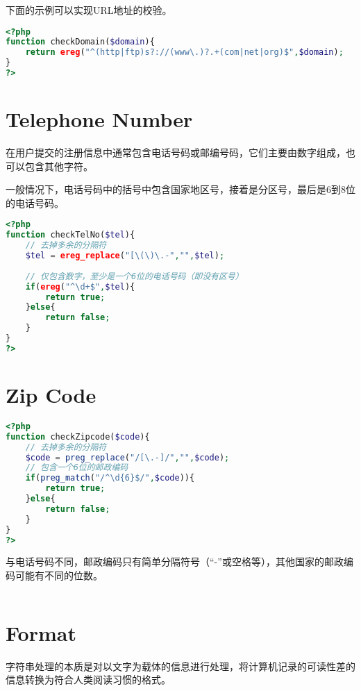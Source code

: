下面的示例可以实现URL地址的校验。


\begin{lstlisting}[language=PHP]
<?php
function checkDomain($domain){
	return ereg("^(http|ftp)s?://(www\.)?.+(com|net|org)$",$domain);
}
?>
\end{lstlisting}

\chapter{Telephone Number}


在用户提交的注册信息中通常包含电话号码或邮编号码，它们主要由数字组成，也可以包含其他字符。

一般情况下，电话号码中的括号中包含国家地区号，接着是分区号，最后是6到8位的电话号码。

\begin{lstlisting}[language=PHP]
<?php
function checkTelNo($tel){
	// 去掉多余的分隔符
	$tel = ereg_replace("[\(\)\.-","",$tel);
	
	// 仅包含数字，至少是一个6位的电话号码（即没有区号）
	if(ereg("^\d+$",$tel){
		return true;
	}else{
		return false;
	}
}
?>
\end{lstlisting}


\chapter{Zip Code}



\begin{lstlisting}[language=PHP]
<?php
function checkZipcode($code){
	// 去掉多余的分隔符
	$code = preg_replace("/[\.-]/","",$code);
	// 包含一个6位的邮政编码
	if(preg_match("/^\d{6}$/",$code)){
		return true;
	}else{
		return false;
	}
}
?>
\end{lstlisting}


与电话号码不同，邮政编码只有简单分隔符号（“-”或空格等），其他国家的邮政编码可能有不同的位数。



\begin{lstlisting}[language=PHP]

\end{lstlisting}


\chapter{Format}

字符串处理的本质是对以文字为载体的信息进行处理，将计算机记录的可读性差的信息转换为符合人类阅读习惯的格式。

